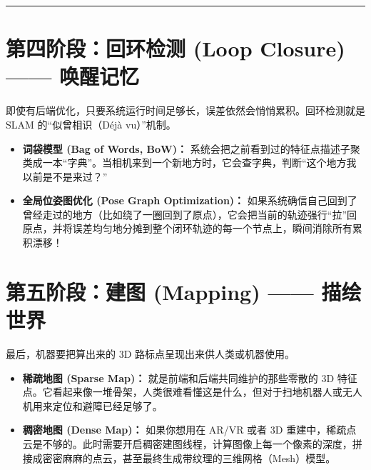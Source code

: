\documentclass[12pt,a4paper]{article}
\begin{document}
\vspace{0.5cm}
\hrule
\vspace{0.5cm}

\section{第四阶段：回环检测 (Loop Closure) —— 唤醒记忆}
即使有后端优化，只要系统运行时间足够长，误差依然会悄悄累积。回环检测就是 SLAM 的“似曾相识（Déjà vu）”机制。
\begin{itemize}
    \item \textbf{词袋模型 (Bag of Words, BoW)：} 系统会把之前看到过的特征点描述子聚类成一本“字典”。当相机来到一个新地方时，它会查字典，判断“这个地方我以前是不是来过？”
    \item \textbf{全局位姿图优化 (Pose Graph Optimization)：} 如果系统确信自己回到了曾经走过的地方（比如绕了一圈回到了原点），它会把当前的轨迹强行“拉”回原点，并将误差均匀地分摊到整个闭环轨迹的每一个节点上，瞬间消除所有累积漂移！
\end{itemize}

\section{第五阶段：建图 (Mapping) —— 描绘世界}
最后，机器要把算出来的 3D 路标点呈现出来供人类或机器使用。
\begin{itemize}
    \item \textbf{稀疏地图 (Sparse Map)：} 就是前端和后端共同维护的那些零散的 3D 特征点。它看起来像一堆骨架，人类很难看懂这是什么，但对于扫地机器人或无人机用来定位和避障已经足够了。
    \item \textbf{稠密地图 (Dense Map)：} 如果你想用在 AR/VR 或者 3D 重建中，稀疏点云是不够的。此时需要开启稠密建图线程，计算图像上每一个像素的深度，拼接成密密麻麻的点云，甚至最终生成带纹理的三维网格（Mesh）模型。
\end{itemize}
\end{document}
